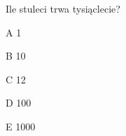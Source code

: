\begin{tresc}
Ile stuleci trwa tysiąclecie?
\end{tresc}
\begin{wariant}{A} 1 \end{wariant}
\begin{wariant}{B} 10 \end{wariant}
\begin{wariant}{C} 12 \end{wariant}
\begin{wariant}{D} 100 \end{wariant}
\begin{wariant}{E} 1000 \end{wariant}
